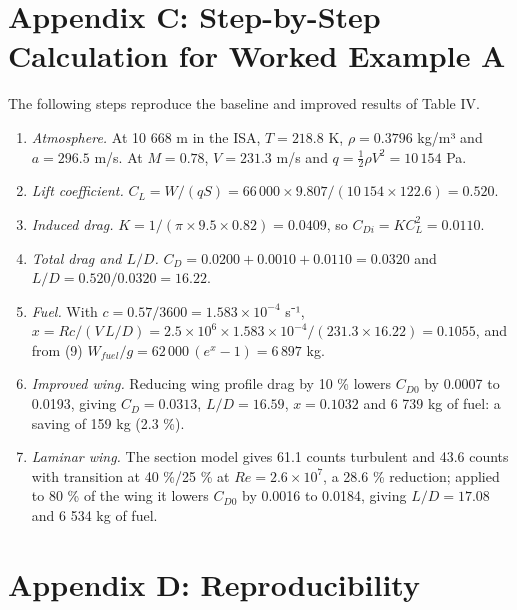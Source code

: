 \documentclass[10pt,a4paper,twocolumn]{article}
\providecommand{\tightlist}{\setlength{\itemsep}{0pt}\setlength{\parskip}{0pt}}
\begin{document}
\hypertarget{appendix-c-step-by-step-calculation-for-worked-example-a}{%
\section*{Appendix C: Step-by-Step Calculation for Worked Example
A}\label{appendix-c-step-by-step-calculation-for-worked-example-a}}

The following steps reproduce the baseline and improved results of Table
IV.

\begin{enumerate}
\def\labelenumi{\arabic{enumi}.}
\tightlist
\item
  \emph{Atmosphere.} At 10 668 m in the ISA, \(T=218.8\) K,
  \(\rho=0.3796\) kg/m³ and \(a=296.5\) m/s. At \(M=0.78\), \(V=231.3\)
  m/s and \(q=\tfrac12\rho V^2=10\,154\) Pa.
\item
  \emph{Lift coefficient.}
  \(C_L = W/(qS) = 66\,000\times9.807/(10\,154\times122.6) = 0.520\).
\item
  \emph{Induced drag.} \(K = 1/(\pi\times9.5\times0.82)=0.0409\), so
  \(C_{Di}=KC_L^2=0.0110\).
\item
  \emph{Total drag and \(L/D\).}
  \(C_D = 0.0200 + 0.0010 + 0.0110 = 0.0320\) and
  \(L/D = 0.520/0.0320 = 16.22\).
\item
  \emph{Fuel.} With \(c = 0.57/3600 = 1.583\times10^{-4}\) s⁻¹,
  \(x = Rc/(V\,L/D) = 2.5\times10^6\times1.583\times10^{-4}/(231.3\times16.22) = 0.1055\),
  and from (9) \(W_{fuel}/g = 62\,000\,(e^{x}-1) = 6\,897\) kg.
\item
  \emph{Improved wing.} Reducing wing profile drag by 10 \% lowers
  \(C_{D0}\) by 0.0007 to 0.0193, giving \(C_D=0.0313\), \(L/D=16.59\),
  \(x=0.1032\) and 6 739 kg of fuel: a saving of 159 kg (2.3 \%).
\item
  \emph{Laminar wing.} The section model gives 61.1 counts turbulent and
  43.6 counts with transition at 40 \%/25 \% at \(Re=2.6\times10^7\), a
  28.6 \% reduction; applied to 80 \% of the wing it lowers \(C_{D0}\)
  by 0.0016 to 0.0184, giving \(L/D=17.08\) and 6 534 kg of fuel.
\end{enumerate}

\hypertarget{appendix-d-reproducibility}{%
\section*{Appendix D:
Reproducibility}\label{appendix-d-reproducibility}}
\end{document}
